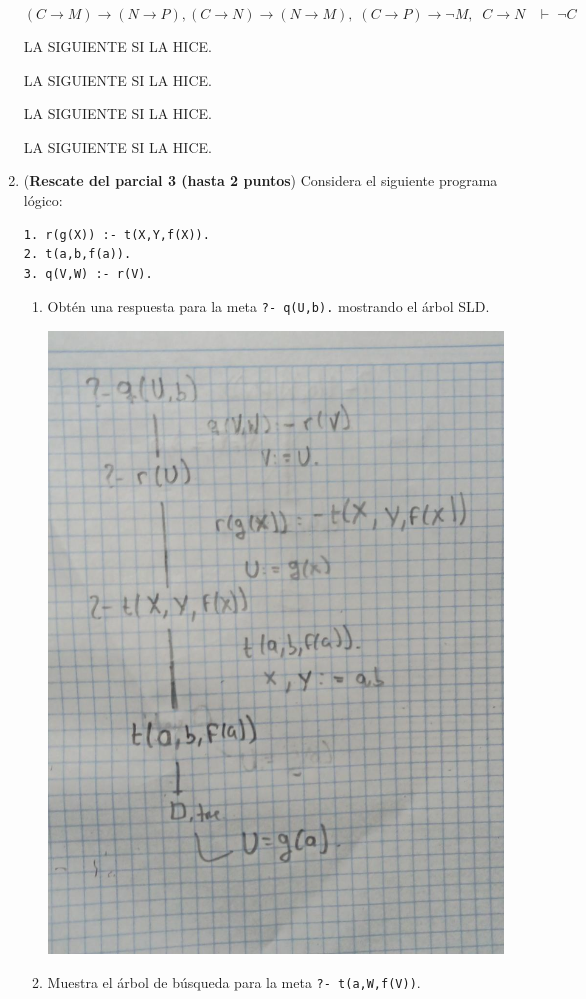 \documentclass[11pt,letterpaper]{article}
\begin{document}
\begin{enumerate}
$$(C\to M) \to (N\to P),(C\to N) \to (N\to M),\;(C\to P) \to \neg M,\;\;C\to N\;\;\;\vdash\; \neg C$$ 

LA SIGUIENTE SI LA HICE.

LA SIGUIENTE SI LA HICE.

LA SIGUIENTE SI LA HICE.

LA SIGUIENTE SI LA HICE.
\newpage
\item (\textbf{Rescate del parcial 3 (hasta 2 puntos}) Considera el siguiente programa lógico:
\begin{verbatim}
1. r(g(X)) :- t(X,Y,f(X)).
2. t(a,b,f(a)).
3. q(V,W) :- r(V).    
\end{verbatim}
\begin{enumerate}
\item Obtén una respuesta para la meta {\tt?- q(U,b).}  mostrando el árbol SLD.

  \begin{center}
    \includegraphics[scale=0.25]{E1}
  \end{center}
\item Muestra el árbol de búsqueda para la meta {\tt ?- t(a,W,f(V))}.


\end{enumerate}
\end{enumerate}
\end{document}
